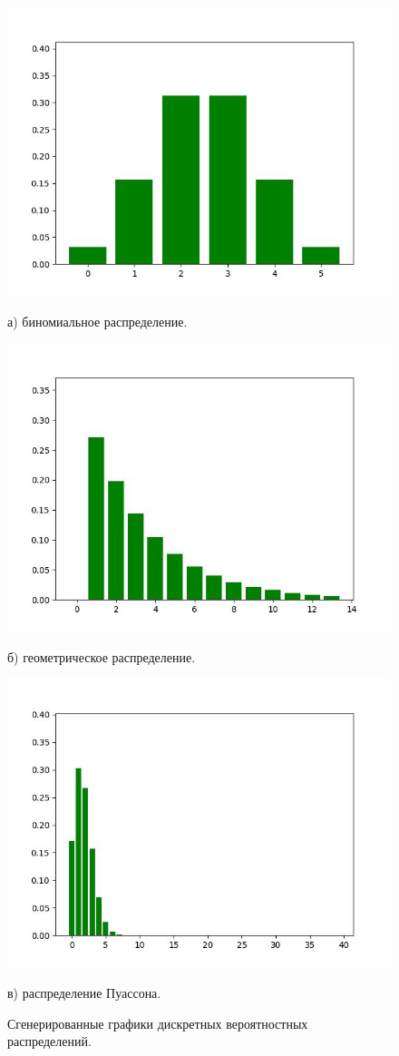 \documentclass[14pt, russian]{scrartcl}
\begin{document}
\begin{figure}[H]
	\centering
	\begin{minipage}[t]{.4\textwidth}
		\centering
		\includegraphics[width=0.75\linewidth]{./img/binom_3.jpg}
		\caption*{а) биномиальное распределение.}
	\end{minipage}
	\noindent
	\begin{minipage}[t]{.4\textwidth}
		\centering
		\includegraphics[width=0.75\linewidth]{./img/geom_3.jpg}
		\caption*{б) геометрическое распределение.}
	\end{minipage}
	\begin{minipage}[t]{.4\textwidth}
		\centering
		\includegraphics[width=0.75\linewidth]{./img/poisson_3.jpg}
		\caption*{в) распределение Пуассона.}
	\end{minipage}
	\caption{Сгенерированные графики дискретных вероятностных распределений.}
	\label{fig:gen1}
\end{figure}
\end{document}
